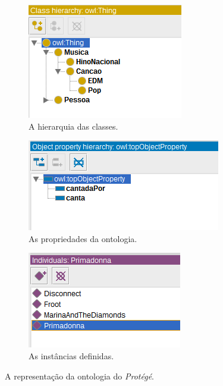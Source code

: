 \begin{figure}
	\centering
	\begin{subfigure}{.3\textwidth}
		\centering
		\includegraphics[width=0.95\linewidth]{Capitulos/Ferramentas/classes}
		\caption{A hierarquia das classes.}
	\end{subfigure}%
	\begin{subfigure}{.475\textwidth}
		\centering
		\includegraphics[width=0.95\linewidth]{Capitulos/Ferramentas/propriedades}
		\caption{As propriedades da ontologia.}
	\end{subfigure}
	\begin{subfigure}{.3\textwidth}
		\centering
		\includegraphics[width=0.95\linewidth]{Capitulos/Ferramentas/individuos}
		\caption{As instâncias definidas.}
	\end{subfigure}
	\caption{A representação da ontologia do \textit{Protégé}.}
	\label{img:Representacao}
\end{figure}
 

